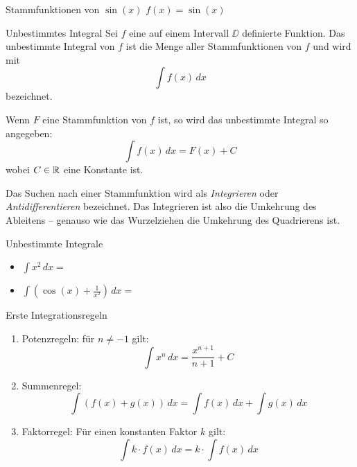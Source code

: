 \begin{bsp}
	{Stammfunktionen von $\sin(x)$}{}
	$f(x) = \sin(x)$

	\vspace*{5cm}
\end{bsp}

\begin{definition}
	{Unbestimmtes Integral}{}
	Sei $f$ eine auf einem Intervall $\DD$ definierte Funktion. Das unbestimmte Integral von $f$ ist die Menge aller Stammfunktionen von $f$ und wird mit
	$$\int f(x) \, dx$$
	bezeichnet.

	Wenn $F$ eine Stammfunktion von $f$ ist, so wird das unbestimmte Integral so angegeben:
	$$\int f(x) \, dx = F(x) + C$$
	wobei $C \in \mathbb{R}$ eine Konstante ist.
\end{definition}

Das Suchen nach einer Stammfunktion wird als \textit{Integrieren} oder \textit{Antidifferentieren} bezeichnet. Das Integrieren ist also die Umkehrung des Ableitens – genauso wie das Wurzelziehen die Umkehrung des Quadrierens ist.

\begin{bsp}
	{Unbestimmte Integrale}{}

	\begin{itemize}
		\item $\int x^2 \, dx = $

		      \vspace*{1cm}

		\item $\int \left( \cos(x) + \frac{1}{x^2}\right) \, dx = $

		      \vspace*{1cm}

	\end{itemize}


\end{bsp}

\clearpage

\begin{satz}
	{Erste Integrationsregeln}{}
	\begin{enumerate}
		\item Potenzregeln: für $n \neq -1$ gilt:
		      $$ \int x^n \, dx = \frac{x^{n+1}}{n+1} + C $$
		\item Summenregel:
		      $$ \int (f(x) + g(x)) \, dx = \int f(x) \, dx + \int g(x) \, dx $$
		\item Faktorregel: Für einen konstanten Faktor $k$ gilt:
		      $$ \int k \cdot f(x) \, dx = k \cdot \int f(x) \, dx $$
	\end{enumerate}
\end{satz}

